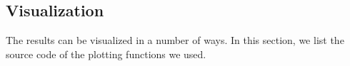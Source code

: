 \documentclass[11pt]{article}
\begin{document}
\begin{appendix}
\subsection{Visualization}
The results can be visualized in a number of ways. In this section, we list the source code of the plotting functions we used.
\begin{landscape}








\end{landscape}
\end{appendix}
\end{document}
